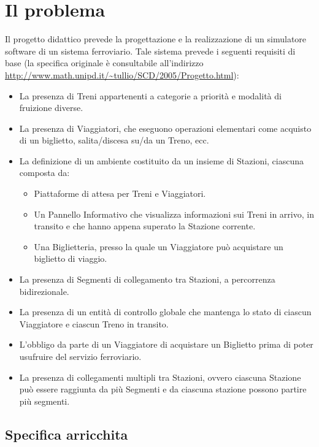 \chapter{Il problema}

Il progetto didattico prevede la progettazione e la realizzazione di un simulatore software di un sistema ferroviario. Tale sistema prevede i seguenti requisiti di base (la specifica originale è consultabile all'indirizzo \url{http://www.math.unipd.it/~tullio/SCD/2005/Progetto.html}):
	\begin{itemize}
		\item La presenza di Treni appartenenti a categorie a priorità e modalità di fruizione diverse. 
		\item La presenza di Viaggiatori, che eseguono operazioni elementari come acquisto di un biglietto, salita/discesa su/da un Treno, ecc.
		\item La definizione di un ambiente costituito da un insieme di Stazioni, ciascuna composta da:
			\begin{itemize}
				\item Piattaforme di attesa per Treni e Viaggiatori.
				\item Un Pannello Informativo che visualizza informazioni sui Treni in arrivo, in transito e che hanno appena superato la Stazione corrente.
				\item Una Biglietteria, presso la quale un Viaggiatore può acquistare un biglietto di viaggio.
			\end{itemize}
		\item La presenza di Segmenti di collegamento tra Stazioni, a percorrenza bidirezionale.
		\item La presenza di un entità di controllo globale che mantenga lo stato di ciascun Viaggiatore e ciascun Treno in transito.
		\item L'obbligo da parte di un Viaggiatore di acquistare un Biglietto prima di poter usufruire del servizio ferroviario.
		\item La presenza di collegamenti multipli tra Stazioni, ovvero ciascuna Stazione può essere raggiunta da più Segmenti e da ciascuna stazione possono partire più segmenti.
	\end{itemize}

\section{Specifica arricchita}


